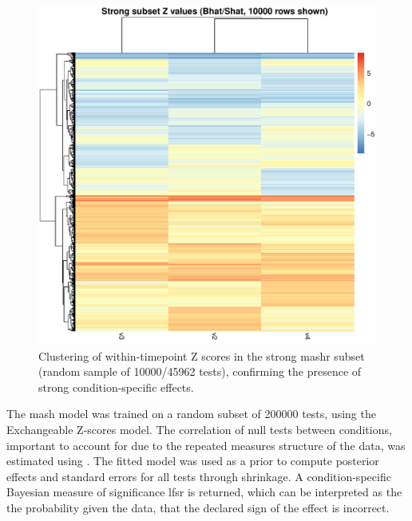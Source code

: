 \begin{figure}
    \centering
    \includegraphics[width=1.0\textwidth,page=1]{mainmatter/figures/chapter_03/mash_mega/mashr.strong_subset_zval_heatmap.cisDist_1e6.sampleAcThresh_15.randomSubsetN_200000.pdf}
    \caption{Clustering of within-timepoint Z scores in the strong mashr subset (random sample of 10000/45962 tests), confirming the presence of strong condition-specific effects.}
    \label{fig:hird_mashr_strongSubset_Z_mega}
\end{figure}

The mash model was trained on a random subset of 200000 tests, using the Exchangeable Z-scores model\autocite{urbut2018FlexibleStatisticalMethods}.
The correlation of null tests between conditions, important to account for due to the repeated measures structure of the data, was estimated using .
The fitted model was used as a prior to compute posterior effects and standard errors for all tests through shrinkage.
%
A condition-specific Bayesian measure of significance \gls{lfsr} is returned, which can be interpreted as the the probability given the data, that the declared sign of the effect is incorrect.

